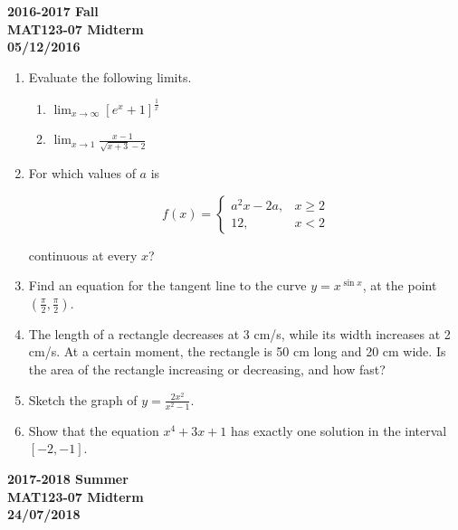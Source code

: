\documentclass[a4paper, 12pt]{article}
\begin{document}
\begin{center}
\textbf{2016-2017 Fall \\MAT123-07 Midterm\\05/12/2016}
\end{center}

\begin{enumerate}[leftmargin=*,label=\textbf{\arabic*.}]

\item Evaluate the following limits.

\begin{enumerate}[leftmargin=*,label=\textbf{\alph*.}]

\item $\displaystyle \lim_{x \to \infty} [ e^x + 1]^{\frac{1}{x}}$

\item $\displaystyle \lim_{x \to 1} \frac{x-1}{\sqrt{x+3} - 2}$

\end{enumerate}

\item For which values of $a$ is

\[
f(x) =
\begin{cases}
a^2x - 2a, & x \geq 2 \\
12,  & x < 2
\end{cases}
\]

continuous at every $x$?

\item Find an equation for the tangent line to the curve $ y = x^{\sin x}$, at the point $(\frac{\pi}{2}, \frac{\pi}{2})$.

\item The length of a rectangle decreases at 3 cm/s, while its width increases at 2 cm/s. At a certain moment, the rectangle is 50 cm long and 20 cm wide. Is the area of the rectangle increasing or decreasing, and how fast?

\item Sketch the graph of $\displaystyle y = \frac{2x^2}{x^2-1}$.

\item Show that the equation $x^4 + 3x + 1$ has exactly one solution in the interval $[-2, -1]$.

\end{enumerate}

\newpage
{}
{}

\begin{center}
\textbf{2017-2018 Summer\\MAT123-07 Midterm\\24/07/2018}
\end{center}
\end{document}

